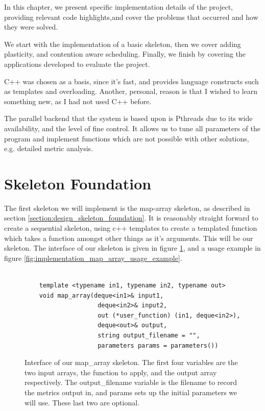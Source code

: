 
In this chapter, we present specific implementation details of the project, providing relevant code highlights,and cover the problems that occurred and how they were solved.

We start with the implementation of a basic skeleton, then  we cover adding plasticity, and contention aware scheduling. Finally, we finish by covering the applications developed to evaluate the project.

C++ was chosen as a basis, since it's fast, and provides language constructs such as templates and overloading. Another, personal, reason is that I wished to learn something new, as I had not used C++ before. 

The parallel backend that the system is based upon is Pthreads due to its wide availability, and the level of fine control. It allows us to tune all parameters of the program and implement functions which are not possible with other solutions, e.g. detailed metric analysis. 



\section{Skeleton Foundation}
\label{section:implementation_skeleton_foundation}

The first skeleton we will implement is the map-array skeleton, as described in section \ref{section:design_skeleton_foundation}. It is reasonably straight forward to create a sequential skeleton, using c++ templates to create a templated function which takes a function amongst other things as it's arguments. This will be our skeleton. The interface of our skeleton is given in figure \ref{fig:implementation_map_array_interface}, and a usage example in figure \ref{fig:implementation_map_array_usage_example}.



\begin{figure}
	\begin{lstlisting}

	template <typename in1, typename in2, typename out>
	void map_array(deque<in1>& input1, 
				   	deque<in2>& input2, 
				   	out (*user_function) (in1, deque<in2>), 
				   	deque<out>& output, 
				   	string output_filename = "", 
				   	parameters params = parameters())

	\end{lstlisting}

	\caption{Interface of our map\_array skeleton. The first four variables are the two input arrays, the function to apply, and the output array respectively. The output\_filename variable is the filename to record the metrics output in, and params sets up the initial parameters we will use. These last two are optional.}
	\label{fig:implementation_map_array_interface}
\end{figure}



